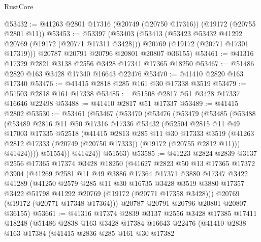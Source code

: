 \begin{lexlean}{RustCore}
\begin{coremodule}
@53432 := @41263 @2801 @17316 (@20749 (@20750 @17316)) (@19172 (@20755 @2801 @11))
@53453 := @53397
    (@53403
      (@53413
        (@53423 @53432 @41292 @20769 (@19172 (@20771 @17311 @3428)))
        @20769
        (@19172 (@20771 @17301 @17319)))
      @20787
      @20791
      @20796
      @20801
      @20807
      @36155)
@53461 := @41316 @17329 @2821 @3138 @2556 @3428 @17341 @17365 @18250
@53467 := @51486 @2820 @163 @3428 @17340 @16643 @22476
@53470 := @41410 @2820 @163 @17340
@53476 := @41415 @2818 @285 @161 @30 @17338 @3519
@53479 := @51503 @2818 @161 @17338
@53485 := @51508 @2817 @51 @3428 @17337 @16646 @22498
@53488 := @41410 @2817 @51 @17337
@53489 := @41415 @2802
@53530 := @53461
    (@53467
      (@53470
        (@53476
          (@53479
            (@53485
              (@53488
                (@53489
                  @2816
                  @11
                  @50
                  @17316
                  @17336
                  @53432
                  (@52504
                    @2815
                    @11
                    @49
                    @17003
                    @17335
                    @52518
                    (@41415
                      @2813
                      @285
                      @11
                      @30
                      @17333
                      @3519
                      (@41263 @2812 @17333 (@20749 (@20750 @17333)) (@19172 (@20755 @2812 @11)))
                      @41424))))
              @51554))
          @41424))
      @51563)
@53585 := @41223
    @2824
    @2839
    @3137
    @2556
    @17365
    @17374
    @3428
    @18250
    (@41627
      @2823
      @50
      @13
      @17365
      @17372
      @3904
      (@41269
        @2581
        @11
        @49
        @3886
        @17364
        @17371
        @3880
        @17347
        @3422
        @41289
        (@41250
          @2579
          @285
          @11
          @30
          @16735
          @3428
          @3519
          @3880
          @17357
          @3422
          @51798
          @41292
          @20769
          (@19172 (@20771 @17358 @3428)))
        @20769
        (@19172 (@20771 @17348 @17364)))
      @20787
      @20791
      @20796
      @20801
      @20807
      @36155)
@53661 := @41316
    @17374
    @2839
    @3137
    @2556
    @3428
    @17385
    @17411
    @18248
    (@51486
      @2838
      @163
      @3428
      @17384
      @16643
      @22476
      (@41410
        @2838
        @163
        @17384
        (@41415
          @2836
          @285
          @161
          @30
          @17382

\end{coremodule}
\end{lexlean}
